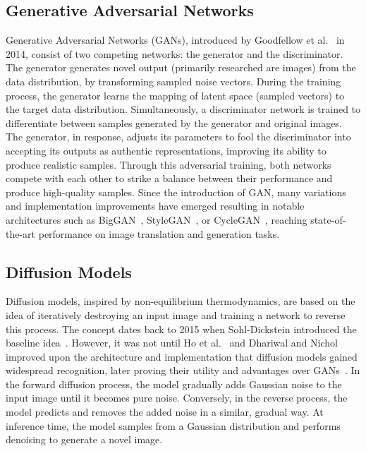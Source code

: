 \documentclass[conference]{IEEEtran}
\begin{document}
\subsection{Generative Adversarial Networks}
Generative Adversarial Networks (GANs), introduced by Goodfellow et al.~\cite{goodfellow_generative_2014} in 2014, consist of two competing networks: the generator and the discriminator. The generator generates novel output (primarily researched are images) from the data distribution, by transforming sampled noise vectors. During the training process, the generator learns the mapping of latent space (sampled vectors) to the target data distribution.
Simultaneously, a discriminator network is trained to differentiate between samples generated by the generator and original images. The generator, in response, adjusts its parameters to fool the discriminator into accepting its outputs as authentic representations, improving its ability to produce realistic samples. Through this adversarial training, both networks compete with each other to strike a balance between their performance and produce high-quality samples. 
Since the introduction of GAN, many variations and implementation improvements have emerged resulting in notable architectures such as BigGAN~\cite{brock_large_2019}, StyleGAN~\cite{karras_style-based_2019}, or CycleGAN~\cite{zhu_unpaired_2020}, reaching state-of-the-art performance on image translation and generation tasks. 

\subsection{Diffusion Models}
Diffusion models, inspired by non-equilibrium thermodynamics, are based on the idea of iteratively destroying an input image and training a network to reverse this process. The concept dates back to 2015 when Sohl-Dickstein introduced the baseline idea~\cite{sohl-dickstein_deep_2015}. However, it was not until Ho et al.~\cite{ho_denoising_2020} and Dhariwal and Nichol~\cite{nichol_improved_2021} improved upon the architecture and implementation that diffusion models gained widespread recognition, later proving their utility and advantages over GANs~\cite{dhariwal_diffusion_2021}.
In the forward diffusion process, the model gradually adds Gaussian noise to the input image until it becomes pure noise. Conversely, in the reverse process, the model predicts and removes the added noise in a similar, gradual way. At inference time, the model samples from a Gaussian distribution and performs denoising to generate a novel image.
\end{document}
